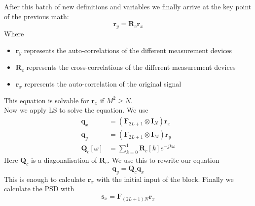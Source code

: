 \documentclass[report, oneside, a4paper, openany]{memoir}
\begin{document}
After this batch of new definitions and variables we finally arrive at the key point of the previous math:
$$
\mathbf{r}_y = \mathbf{R}_c\mathbf{r}_x
$$ 
Where
\begin{itemize}
\item $\mathbf{r}_y$ represents the auto-correlations of the different measurement devices
\item $\mathbf{R}_c$ represents the cross-correlations of the different measurement devices 
\item $\mathbf{r}_x$ represents the auto-correlation of the original signal
\end{itemize}
This equation is solvable for $\mathbf{r}_x$ if $M^2\geq N$. \\
Now we apply LS to solve the equation. We use
\begin{equation*}
\begin{split}
\mathbf{q}_x &= (\mathbf{F}_{2L+1}\otimes \mathbf{I}_N)\mathbf{r}_x \\
\mathbf{q}_y &= (\mathbf{F}_{2L+1}\otimes \mathbf{I}_M)\mathbf{r}_y \\
\mathbf{Q}_c[\omega] &= \sum_{k=0}^1\mathbf{R}_c[k]e^{-jk\omega}
\end{split}
\end{equation*}
Here $\mathbf{Q}_c$ is a diagonalisation of $\mathbf{R}_c$. We use this to rewrite our equation
$$
\mathbf{q}_y = \mathbf{Q}_c\mathbf{q}_x
$$
This is enough to calculate $\mathbf{r}_x$ with the initial input of the block. Finally we calculate the PSD with
$$
\mathbf{s}_x = \mathbf{F}_{(2L+1)N}\mathbf{r}_x
$$ 
\end{document}
